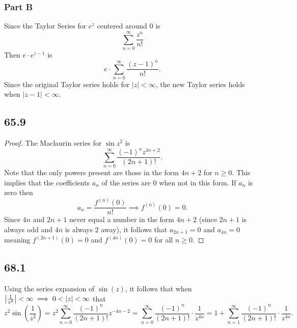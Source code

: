 \documentclass[12pt]{extarticle}
\begin{document}
\begin{problem} \subsubsection*{Part B}
    Since the Taylor Series for $e^z$ centered around $0$ is
    \[
        \sum_{n = 0}^\infty \frac{z^n}{n!}
    \]
    Then $e \cdot e^{z-1}$ is
    \[
        e \cdot \sum_{n = 0}^\infty \frac{(z-1)^n}{n!}
    .\]
    Since the original Taylor series holds for $|z| < \infty$, the new Taylor series holds when $|z-1| < \infty$.
\end{problem}

\subsection*{65.9}
\begin{proof}
    The Maclaurin series for $\sin z^2$ is
    \[
        \sum_{n=0}^\infty \frac{(-1)^n z^{4n + 2}}{(2n+1)!}
    .\]
    Note that the only powers present are those in the form $4n+2$ for $n \geq 0$. This implies that the coefficients $a_n$ of the series are $0$ when not in this form. If $a_n$ is zero then
    \[
        a_n = \frac{f^{(n)}(0)}{n!} \implies f^{(n)}(0) = 0
    .\]
    Since $4n$ and $2n+1$ never equal a number in the form $4n+2$ (since $2n+1$ is always odd and $4n$ is always $2$ away), it follows that $a_{2n+1} = 0$ and $a_{4n} = 0$ meaning $f^{(2n+1)}(0) = 0$ and $f^{(4n)}(0)=0$ for all $n \geq 0$.
\end{proof}

\subsection*{68.1} 
\begin{problem}
    Using the series expansion of $\sin(z)$, it follows that when $\qty|\frac{1}{z^2}| < \infty \implies 0 < |z| < \infty$ that
    \[
        z^2 \sin(\frac{1}{z^2}) = z^2 \sum_{n=0}^\infty \frac{(-1)^n}{(2n+1)!} z^{-4n - 2} = \sum_{n=0}^\infty \frac{(-1)^n}{(2n+1)!} \cdot \frac{1}{z^{4n}} = 1 + \sum_{n=1}^\infty \frac{(-1)^n}{(2n+1)!} \cdot \frac{1}{z^{4n}}
    .\]
\end{problem}
\end{document}
